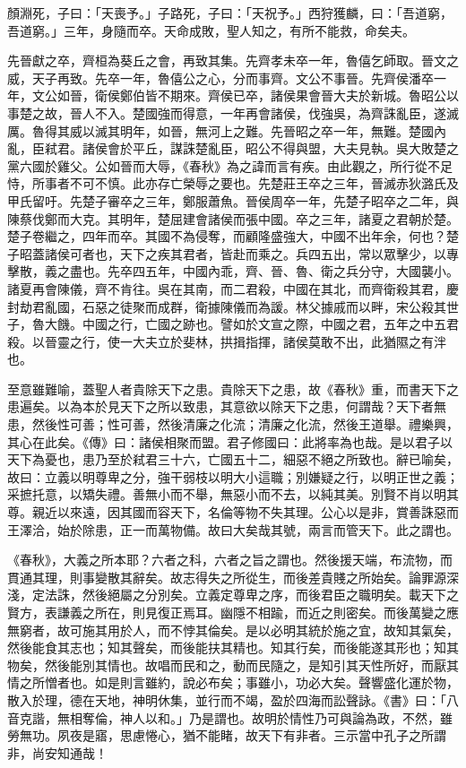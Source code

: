 
顏淵死，子曰：「天喪予。」子路死，子曰：「天祝予。」西狩獲麟，曰：「吾道窮，吾道窮。」三年，身隨而卒。天命成敗，聖人知之，有所不能救，命矣夫。

先晉獻之卒，齊桓為葵丘之會，再致其集。先齊孝未卒一年，魯僖乞師取。晉文之威，天子再致。先卒一年，魯僖公之心，分而事齊。文公不事晉。先齊侯潘卒一年，文公如晉，衛侯鄭伯皆不期來。齊侯已卒，諸侯果會晉大夫於新城。魯昭公以事楚之故，晉人不入。楚國強而得意，一年再會諸侯，伐強吳，為齊誅亂臣，遂滅厲。魯得其威以滅其明年，如晉，無河上之難。先晉昭之卒一年，無難。楚國內亂，臣弒君。諸侯會於平丘，謀誅楚亂臣，昭公不得與盟，大夫見執。吳大敗楚之黨六國於雞父。公如晉而大辱，《春秋》為之諱而言有疾。由此觀之，所行從不足恃，所事者不可不慎。此亦存亡榮辱之要也。先楚莊王卒之三年，晉滅赤狄潞氏及甲氏留吁。先楚子審卒之三年，鄭服蕭魚。晉侯周卒一年，先楚子昭卒之二年，與陳蔡伐鄭而大克。其明年，楚屈建會諸侯而張中國。卒之三年，諸夏之君朝於楚。楚子卷繼之，四年而卒。其國不為侵奪，而顧隆盛強大，中國不出年余，何也？楚子昭蓋諸侯可者也，天下之疾其君者，皆赴而乘之。兵四五出，常以眾擊少，以專擊散，義之盡也。先卒四五年，中國內乖，齊、晉、魯、衛之兵分守，大國襲小。諸夏再會陳儀，齊不肯往。吳在其南，而二君殺，中國在其北，而齊衛殺其君，慶封劫君亂國，石惡之徒聚而成群，衛據陳儀而為諼。林父據戚而以畔，宋公殺其世子，魯大饑。中國之行，亡國之跡也。譬如於文宣之際，中國之君，五年之中五君殺。以晉靈之行，使一大夫立於斐林，拱揖指揮，諸侯莫敢不出，此猶隰之有泮也。


至意雖難喻，蓋聖人者貴除天下之患。貴除天下之患，故《春秋》重，而書天下之患遍矣。以為本於見天下之所以致患，其意欲以除天下之患，何謂哉？天下者無患，然後性可善；性可善，然後清廉之化流；清廉之化流，然後王道舉。禮樂興，其心在此矣。《傳》曰：諸侯相聚而盟。君子修國曰：此將率為也哉。是以君子以天下為憂也，患乃至於弒君三十六，亡國五十二，細惡不絕之所致也。辭已喻矣，故曰：立義以明尊卑之分，強干弱枝以明大小這職；別嫌疑之行，以明正世之義；采摭托意，以矯失禮。善無小而不舉，無惡小而不去，以純其美。別賢不肖以明其尊。親近以來遠，因其國而容天下，名倫等物不失其理。公心以是非，賞善誅惡而王澤洽，始於除患，正一而萬物備。故曰大矣哉其號，兩言而管天下。此之謂也。


《春秋》，大義之所本耶？六者之科，六者之旨之謂也。然後援天端，布流物，而貫通其理，則事變散其辭矣。故志得失之所從生，而後差貴賤之所始矣。論罪源深淺，定法誅，然後絕屬之分別矣。立義定尊卑之序，而後君臣之職明矣。載天下之賢方，表謙義之所在，則見復正焉耳。幽隱不相踰，而近之則密矣。而後萬變之應無窮者，故可施其用於人，而不悖其倫矣。是以必明其統於施之宜，故知其氣矣，然後能食其志也；知其聲矣，而後能扶其精也。知其行矣，而後能遂其形也；知其物矣，然後能別其情也。故唱而民和之，動而民隨之，是知引其天性所好，而厭其情之所憎者也。如是則言雖約，說必布矣；事雖小，功必大矣。聲響盛化運於物，散入於理，德在天地，神明休集，並行而不竭，盈於四海而訟聲詠。《書》曰：「八音克諧，無相奪倫，神人以和。」乃是謂也。故明於情性乃可與論為政，不然，雖勞無功。夙夜是寤，思慮惓心，猶不能睹，故天下有非者。三示當中孔子之所謂非，尚安知通哉！

